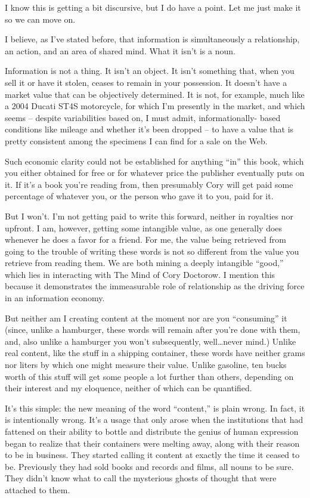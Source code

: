 I know this is getting a bit discursive, but I do have a point. Let
me just make it so we can move on.

I believe, as I've stated before, that information is
simultaneously a relationship, an action, and an area of shared
mind. What it isn't is a noun.

Information is not a thing. It isn't an object. It isn't something
that, when you sell it or have it stolen, ceases to remain in your
possession. It doesn't have a market value that can be objectively
determined. It is not, for example, much like a 2004 Ducati ST4S
motorcycle, for which I'm presently in the market, and which seems
-- despite variabilities based on, I must admit, informationally-
based conditions like mileage and whether it's been dropped -- to
have a value that is pretty consistent among the specimens I can
find for a sale on the Web.

Such economic clarity could not be established for anything ``in''
this book, which you either obtained for free or for whatever price
the publisher eventually puts on it. If it's a book you're reading
from, then presumably Cory will get paid some percentage of
whatever you, or the person who gave it to you, paid for it.

But I won't. I'm not getting paid to write this forward, neither in
royalties nor upfront. I am, however, getting some intangible
value, as one generally does whenever he does a favor for a friend.
For me, the value being retrieved from going to the trouble of
writing these words is not so different from the value you retrieve
from reading them. We are both mining a deeply intangible ``good,''
which lies in interacting with The Mind of Cory Doctorow. I mention
this because it demonstrates the immeasurable role of relationship
as the driving force in an information economy.

But neither am I creating content at the moment nor are you
``consuming'' it (since, unlike a hamburger, these words will remain
after you're done with them, and, also unlike a hamburger you won't
subsequently, well\ldots never mind.) Unlike real content, like the
stuff in a shipping container, these words have neither grams nor
liters by which one might measure their value. Unlike gasoline, ten
bucks worth of this stuff will get some people a lot further than
others, depending on their interest and my eloquence, neither of
which can be quantified.

It's this simple: the new meaning of the word ``content,'' is plain
wrong. In fact, it is intentionally wrong. It's a usage that only
arose when the institutions that had fattened on their ability to
bottle and distribute the genius of human expression began to
realize that their containers were melting away, along with their
reason to be in business. They started calling it content at
exactly the time it ceased to be. Previously they had sold books
and records and films, all nouns to be sure. They didn't know what
to call the mysterious ghosts of thought that were attached to
them.


